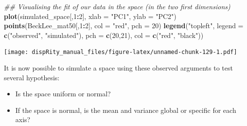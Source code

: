 \documentclass[]{book}
\newenvironment{Shaded}{\begin{snugshade}}{\end{snugshade}}
\newcommand{\CommentTok}[1]{\textcolor[rgb]{0.56,0.35,0.01}{\textit{#1}}}
\newcommand{\DataTypeTok}[1]{\textcolor[rgb]{0.13,0.29,0.53}{#1}}
\newcommand{\DecValTok}[1]{\textcolor[rgb]{0.00,0.00,0.81}{#1}}
\newcommand{\KeywordTok}[1]{\textcolor[rgb]{0.13,0.29,0.53}{\textbf{#1}}}
\newcommand{\NormalTok}[1]{#1}
\newcommand{\OperatorTok}[1]{\textcolor[rgb]{0.81,0.36,0.00}{\textbf{#1}}}
\newcommand{\StringTok}[1]{\textcolor[rgb]{0.31,0.60,0.02}{#1}}
\providecommand{\tightlist}{%
  \setlength{\itemsep}{0pt}\setlength{\parskip}{0pt}}
\begin{document}
\begin{Shaded}
\begin{Highlighting}[]
\CommentTok{## Visualising the fit of our data in the space (in the two first dimensions)}
\KeywordTok{plot}\NormalTok{(simulated_space[,}\DecValTok{1}\OperatorTok{:}\DecValTok{2}\NormalTok{], }\DataTypeTok{xlab =} \StringTok{"PC1"}\NormalTok{, }\DataTypeTok{ylab =} \StringTok{"PC2"}\NormalTok{)}
\KeywordTok{points}\NormalTok{(BeckLee_mat50[,}\DecValTok{1}\OperatorTok{:}\DecValTok{2}\NormalTok{], }\DataTypeTok{col =} \StringTok{"red"}\NormalTok{, }\DataTypeTok{pch =} \DecValTok{20}\NormalTok{)}
\KeywordTok{legend}\NormalTok{(}\StringTok{"topleft"}\NormalTok{, }\DataTypeTok{legend =} \KeywordTok{c}\NormalTok{(}\StringTok{"observed"}\NormalTok{, }\StringTok{"simulated"}\NormalTok{),}
        \DataTypeTok{pch =} \KeywordTok{c}\NormalTok{(}\DecValTok{20}\NormalTok{,}\DecValTok{21}\NormalTok{), }\DataTypeTok{col =} \KeywordTok{c}\NormalTok{(}\StringTok{"red"}\NormalTok{, }\StringTok{"black"}\NormalTok{))}
\end{Highlighting}
\end{Shaded}

\texttt{[image: dispRity\_manual\_files/figure-latex/unnamed-chunk-129-1.pdf]}

It is now possible to simulate a space using these observed arguments to test several hypothesis:

\begin{itemize}
\tightlist
\item
  Is the space uniform or normal?
\item
  If the space is normal, is the mean and variance global or specific for each axis?
\end{itemize}
\end{document}
